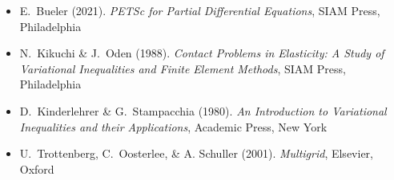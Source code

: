 
\newcommand{\sdoi}[1]{\,{\tiny \href{https://doi.org/#1}{doi:#1}}}
\begin{itemize}
\item E.~Bueler (2021). \emph{PETSc for Partial Differential Equations}, SIAM Press, Philadelphia
\item N.~Kikuchi \& J.~Oden (1988).  \emph{Contact Problems in Elasticity: A Study of Variational Inequalities and Finite Element Methods}, SIAM Press, Philadelphia
\item D.~Kinderlehrer \& G.~Stampacchia (1980). \emph{An Introduction to Variational Inequalities and their Applications}, Academic Press, New York
\item U.~Trottenberg, C.~Oosterlee, \& A. Schuller (2001).  \emph{Multigrid}, Elsevier, Oxford
\end{itemize}

